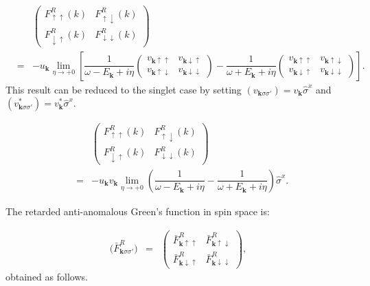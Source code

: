 \documentclass[uplatex,a4j,12pt,dvipdfmx]{jsarticle}
\begin{document}
\begin{eqnarray}
	&&
	\left(
	\begin{array}{cc}
			F_{\uparrow \uparrow}^{R}(k)   & F_{\uparrow \downarrow}^{R}(k)   \\[3mm]
			F_{\downarrow \uparrow}^{R}(k) & F_{\downarrow \downarrow}^{R}(k)
		\end{array}
	\right)
	\nonumber \\ &=&
	-
	u_{ \bm{k} }
	\lim_{\eta \to +0}
	\left[
		\dfrac{ 1 }{ \omega - E_{\bm{k}} + i \eta }
		\left(
		\begin{array}{cc}
				v_{ \bm{k} \uparrow \uparrow }
				 &
				v_{ \bm{k} \downarrow \uparrow }
				\\[3mm]
				v_{ \bm{k} \uparrow \downarrow }
				 &
				v_{ \bm{k} \downarrow \downarrow }
			\end{array}
		\right)
		-
		\dfrac{ 1 }{ \omega + E_{\bm{k}} + i \eta }
		\left(
		\begin{array}{cc}
				v_{ \bm{k} \uparrow \uparrow }
				 &
				v_{ \bm{k} \uparrow \downarrow }
				\\[3mm]
				v_{ \bm{k} \downarrow \uparrow }
				 &
				v_{ \bm{k} \downarrow \downarrow }
			\end{array}
		\right)
		\right]
	.
\end{eqnarray}
%
This result can be reduced to the singlet case by setting $(v_{\bm{k} \sigma \sigma'}) = v_{\bm{k}} \hat{\sigma}^{x}$
and
$(v_{\bm{k} \sigma \sigma'}^{*}) = v_{\bm{k}}^{*} \hat{\sigma}^{x}$.

\begin{eqnarray}
	&&
	\left(
	\begin{array}{cc}
			F_{\uparrow \uparrow}^{R}(k)   & F_{\uparrow \downarrow}^{R}(k)   \\[3mm]
			F_{\downarrow \uparrow}^{R}(k) & F_{\downarrow \downarrow}^{R}(k)
		\end{array}
	\right)
	\nonumber \\ &=&
	-
	u_{ \bm{k} }
	v_{ \bm{k} }
	\lim_{\eta \to +0}
	\left(
	\dfrac{ 1 }{ \omega - E_{\bm{k}} + i \eta }
	-
	\dfrac{ 1 }{ \omega + E_{\bm{k}} + i \eta }
	\right)
	\hat{\sigma}^{x}
	.
\end{eqnarray}
%

The retarded anti-anomalous Green's function in spin space is:

\begin{eqnarray}
	\Big(
	\bar{F}_{\bm{k} \sigma \sigma'}^{R}
	\Big)
	&=&
	\left(
	\begin{array}{cc}
			\bar{F}_{\bm{k} \uparrow \uparrow}^{R}   & \bar{F}_{\bm{k} \uparrow \downarrow}^{R}   \\[3mm]
			\bar{F}_{\bm{k} \downarrow \uparrow}^{R} & \bar{F}_{\bm{k} \downarrow \downarrow}^{R}
		\end{array}
	\right)
	,
\end{eqnarray}
%
obtained as follows.
\end{document}
